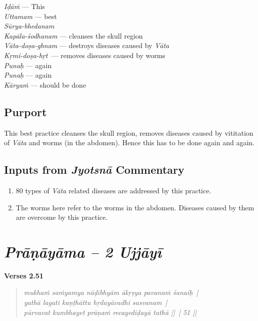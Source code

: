 \begin{multicols}{2}
\textit{Iḍāṁ} --- This\\
\textit{Uttamam} --- best\\
\textit{Sūrya-bhedanam} \\
\textit{Kapāla-śodhanam} --- cleanses the skull region\\
\textit{Vāta-doṣa-ghnam} --- destroys diseases caused by \textit{Vāta}\\
\textit{Kṛmi-doṣa-hṛt }---  removes diseases caused by worms \\
\textit{Punaḥ} --- again \\
\textit{Punaḥ} --- again \\
\textit{Kāryaṁ} --- should be done
\end{multicols}

\subsection*{Purport}

This best practice cleanses the skull region, removes diseases caused by vititation of \textit{Vāta} and worms (in the abdomen). Hence this has to be done again and again.

\subsection*{Inputs from \textit{Jyotsnā} Commentary}

\begin{enumerate}
\itemsep=0pt
\item 80 types of \textit{Vāta} related diseases are addressed by this practice. 
\item The worms here refer to the worms in the abdomen. Diseases caused by them are overcome by this practice.
\end{enumerate}

\section*{\textit{Prāṇāyāma – 2 Ujjāyī}}

\noindent \textbf{Verses 2.51}

\begin{verse}
\textit{mukhaṁ saṁyamya nāḍībhyām ākṛṣya pavanaṁ śanaiḥ |\\
yathā lagati kaṇṭhāttu hṛdayāvadhi sasvanam |\\
pūrvavat kumbhayet prāṇaṁ recayediḍayā tathā || | 51 ||}
\end{verse}

